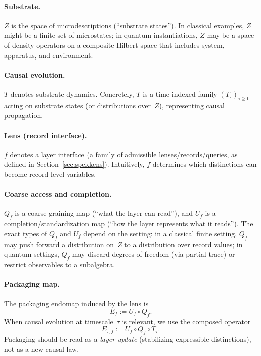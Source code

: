 \paragraph{Substrate.}
$Z$ is the space of microdescriptions (``substrate states''). In classical examples, $Z$ might be a finite set of microstates; in quantum instantiations, $Z$ may be a space of density operators on a composite Hilbert space that includes system, apparatus, and environment.

\paragraph{Causal evolution.}
$T$ denotes substrate dynamics. Concretely, $T$ is a time-indexed family $(T_\tau)_{\tau\ge 0}$ acting on substrate states (or distributions over~$Z$), representing causal propagation.

\paragraph{Lens (record interface).}
$f$ denotes a layer interface (a family of admissible lenses/records/queries, as defined in Section~\ref{sec:spekkens}). Intuitively, $f$ determines which distinctions can become record-level variables.

\paragraph{Coarse access and completion.}
$Q_f$ is a coarse-graining map (``what the layer can read''), and $U_f$ is a completion/standardization map (``how the layer represents what it reads'').
The exact types of $Q_f$ and $U_f$ depend on the setting:
in a classical finite setting, $Q_f$ may push forward a distribution on~$Z$ to a distribution over record values;
in quantum settings, $Q_f$ may discard degrees of freedom (via partial trace) or restrict observables to a subalgebra.

\paragraph{Packaging map.}
The packaging endomap induced by the lens is
\[
E_f := U_f \circ Q_f.
\]
When causal evolution at timescale~$\tau$ is relevant, we use the composed operator
\[
E_{\tau,f} := U_f \circ Q_f \circ T_\tau .
\]
Packaging should be read as a \emph{layer update} (stabilizing expressible distinctions), not as a new causal law.

